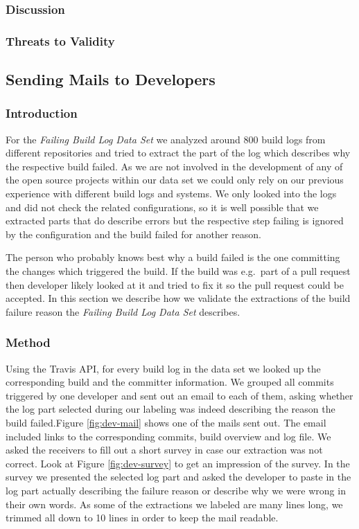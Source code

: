 \documentclass[\myrootdir/main.tex]{subfiles}
\begin{document}
\subsubsection{Discussion}
\subsubsection{Threats to Validity}

\subsection{Sending Mails to Developers}
\subsubsection{Introduction}
For the \emph{Failing Build Log Data Set} we analyzed around 800 build logs from different repositories and tried to extract the part of the log which describes why the respective build failed.
As we are not involved in the development of any of the open source projects within our data set we could only rely on our previous experience with different build logs and systems.
We only looked into the logs and did not check the related configurations, so it is well possible that we extracted parts that do describe errors but the respective step failing is ignored by the configuration and the build failed for another reason.

The person who probably knows best why a build failed is the one committing the changes which triggered the build.
If the build was e.g.\ part of a pull request then developer likely looked at it and tried to fix it so the pull request could be accepted.
In this section we describe how we validate the extractions of the build failure reason the \emph{Failing Build Log Data Set} describes.
\subsubsection{Method}
Using the Travis API, for every build log in the data set we looked up the corresponding build and the committer information.
We grouped all commits triggered by one developer and sent out an email to each of them, asking whether the log part selected during our labeling was indeed describing the reason the build failed.Figure \ref{fig:dev-mail} shows one of the mails sent out.
The email included links to the corresponding commits, build overview and log file.
We asked the receivers to fill out a short survey in case our extraction was not correct.
Look at Figure \ref{fig:dev-survey} to get an impression of the survey.
In the survey we presented the selected log part and asked the developer to paste in the log part actually describing the failure reason or describe why we were wrong in their own words.
As some of the extractions we labeled are many lines long, we trimmed all down to 10 lines in order to keep the mail readable.
\end{document}
